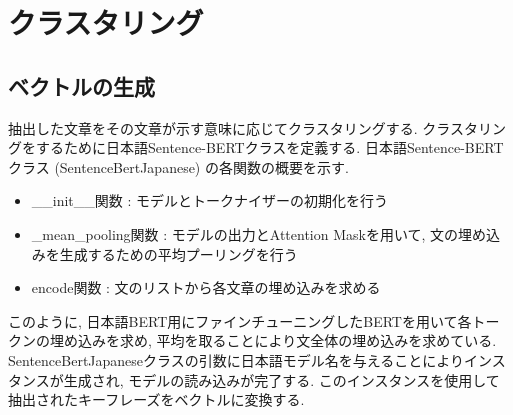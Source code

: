 
\section{クラスタリング}\label{clustering}
\subsection{ベクトルの生成}
抽出した文章をその文章が示す意味に応じてクラスタリングする. クラスタリングをするために日本語Sentence-BERTクラスを定義する. 日本語Sentence-BERTクラス (SentenceBertJapanese) の各関数の概要を示す. 
\begin{itemize}
  \item \_\_init\_\_関数 : モデルとトークナイザーの初期化を行う
  \item \_mean\_pooling関数 : モデルの出力とAttention Maskを用いて, 文の埋め込みを生成するための平均プーリングを行う
  \item encode関数 : 文のリストから各文章の埋め込みを求める
\end{itemize}

このように, 日本語BERT用にファインチューニングしたBERTを用いて各トークンの埋め込みを求め, 平均を取ることにより文全体の埋め込みを求めている. 
SentenceBertJapaneseクラスの引数に日本語モデル名を与えることによりインスタンスが生成され, モデルの読み込みが完了する. このインスタンスを使用して抽出されたキーフレーズをベクトルに変換する. 




